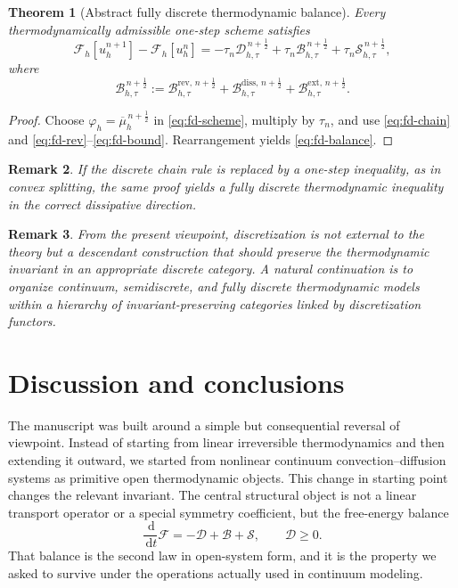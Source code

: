 \documentclass[11pt]{article}
\newtheorem{theorem}{Theorem}[section]
\newtheorem{remark}[theorem]{Remark}
\newcommand{\dd}{\,\mathrm{d}}
\newcommand{\F}{\mathcal{F}}
\newcommand{\Diss}{\mathcal{D}}
\newcommand{\Bnd}{\mathcal{B}}
\newcommand{\Src}{\mathcal{S}}
\begin{document}
\begin{theorem}[Abstract fully discrete thermodynamic balance]\label{thm:fully-discrete}
Every thermodynamically admissible one-step scheme satisfies
\begin{equation}\label{eq:fd-balance}
\F_h[u_h^{n+1}] - \F_h[u_h^n]
=
-\tau_n \Diss_{h,\tau}^{\,n+\frac12}
+
\tau_n \Bnd_{h,\tau}^{\,n+\frac12}
+
\tau_n \Src_{h,\tau}^{\,n+\frac12},
\end{equation}
where
\[
\Bnd_{h,\tau}^{\,n+\frac12}
:=
\Bnd_{h,\tau}^{\mathrm{rev},\,n+\frac12}
+\Bnd_{h,\tau}^{\mathrm{diss},\,n+\frac12}
+\Bnd_{h,\tau}^{\mathrm{ext},\,n+\frac12}.
\]
\end{theorem}

\begin{proof}
Choose \(\varphi_h=\overline{\mu}_h^{\,n+\frac12}\) in \eqref{eq:fd-scheme}, multiply
by \(\tau_n\), and use \eqref{eq:fd-chain} and
\eqref{eq:fd-rev}--\eqref{eq:fd-bound}. Rearrangement yields
\eqref{eq:fd-balance}.
\end{proof}

\begin{remark}
If the discrete chain rule is replaced by a one-step inequality, as in convex
splitting, the same proof yields a fully discrete thermodynamic inequality in the
correct dissipative direction.
\end{remark}

\begin{remark}
From the present viewpoint, discretization is not external to the theory but a
descendant construction that should preserve the thermodynamic invariant in an
appropriate discrete category. A natural continuation is to organize continuum,
semidiscrete, and fully discrete thermodynamic models within a hierarchy of
invariant-preserving categories linked by discretization functors.
\end{remark}

\section{Discussion and conclusions}

The manuscript was built around a simple but consequential reversal of viewpoint.
Instead of starting from linear irreversible thermodynamics and then extending it
outward, we started from nonlinear continuum convection--diffusion systems as
primitive open thermodynamic objects. This change in starting point changes the
relevant invariant. The central structural object is not a linear transport operator
or a special symmetry coefficient, but the free-energy balance
\[
\frac{\dd}{\dd t}\F = -\Diss + \Bnd + \Src,
\qquad
\Diss\ge 0.
\]
That balance is the second law in open-system form, and it is the property we asked
to survive under the operations actually used in continuum modeling.
\end{document}
